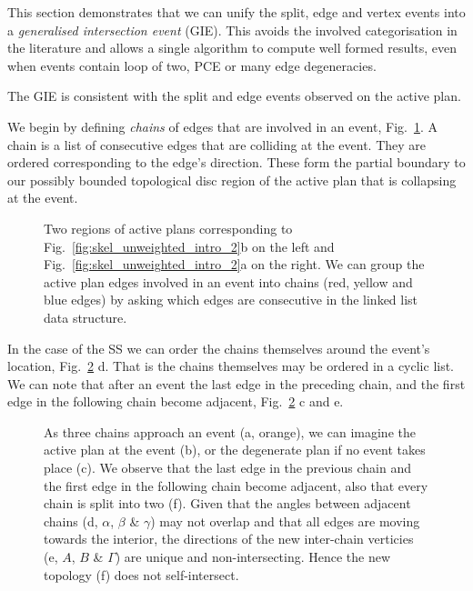This section demonstrates that we can unify the split, edge and vertex events into a \emph{generalised intersection event} (GIE). This avoids the involved categorisation in the literature and allows a single algorithm to compute well formed results, even when events contain loop of two, PCE or many edge degeneracies.

The GIE is consistent with the split and edge events observed on the active plan.

We begin by defining \emph{chains} of edges that are involved in an event, Fig.~\ref{fig:skel_chains}. A chain is a list of consecutive edges that are colliding at the event. They are ordered corresponding to the edge's direction. These form the partial boundary to our possibly bounded topological disc region of the active plan that is collapsing at the event.

\begin{figure}
  \centering
  \def\svgwidth{0.5\columnwidth}
  
  \caption[Adjacent edges in an event form chains]{\label{fig:skel_chains} Two regions of active plans corresponding to Fig.~\ref{fig:skel_unweighted_intro_2}b on the left and Fig.~\ref{fig:skel_unweighted_intro_2}a on the right. We can group the active plan edges involved in an event into chains (red, yellow and blue edges) by asking which edges are consecutive in the linked list data structure.}
\end{figure}

In the case of the SS we can order the chains themselves around the event's location, Fig.~\ref{fig:skel_gie_intro} d. That is the chains themselves may be ordered in a cyclic list. %
We can note that after an event the last edge in the preceding chain, and the first edge in the following chain become adjacent, Fig.~\ref{fig:skel_gie_intro} c and e.

\begin{figure}
  \centering
  \def\svgwidth{0.8\columnwidth}
  
  \caption[Chains approaching an event]{\label{fig:skel_gie_intro} As three chains approach an event (a, orange), we can imagine the active plan at the event (b), or the degenerate plan if no event takes place (c). We observe that the last edge in the previous chain and the first edge in the following chain become adjacent, also that every chain is split into two (f). Given that the angles between adjacent chains (d, $\alpha$, $\beta$ \& $\gamma$) may not overlap and that all edges are moving towards the interior, the directions of the new inter-chain verticies (e, $A$, $B$ \& $\Gamma$) are unique and non-intersecting. Hence the new topology (f) does not self-intersect.}
\end{figure}

